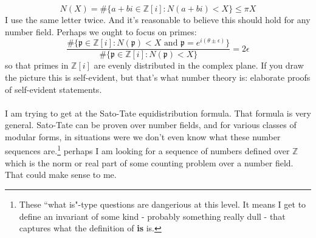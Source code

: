\documentclass[12pt]{article}
\begin{document}
$$ N(X) = \# \{ a+bi \in \mathbb{Z}[i]: N(a+bi) < X \} \leq \pi X $$
I use the same letter twice.  And it's reasonable to believe this should hold for any number field.  Perhaps we ought to focus on primes:
$$ \frac{\# \{ \mathfrak{p} \in \mathbb{Z}[i]: N(\mathfrak{p}) < X \text{ and } \mathfrak{p}= e^{i(\theta \pm \epsilon)} \}}{\# \{ \mathfrak{p} \in \mathbb{Z}[i]: N(\mathfrak{p}) < X \}} = 2\epsilon$$ 
so that primes in $\mathbb{Z}[i]$ are evenly distributed in the complex plane.  If you draw the picture  this is self-evident, but that's what number theory is:  {\color{orange!50!black}elaborate proofs of self-evident statements}. \\ \\
I am trying to get at the Sato-Tate equidistribution formula.   That formula is very general. Sato-Tate can be proven over number fields, and for various classes of modular forms, in situations were we don't even know what these number sequences are.\footnote{These ``what is"-type questions are dangerious at this level.  It means I get to define an invariant of some kind - probably something really dull - that captures what the definition of \textbf{is} is.} perhaps I am looking for a sequence of numbers defined over $\mathbb{Z}$ which is the norm or real part of some counting problem over a number field.  That could make sense to me. 

\newpage 
\end{document}
